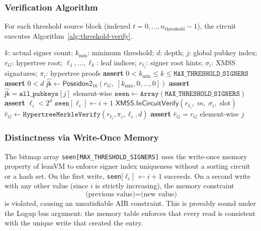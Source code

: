 \documentclass[11pt,a4paper]{article}
\newcommand{\XMSS}{\textsf{XMSS}\xspace}
\newcommand{\poseidon}{\textsf{Poseidon2}\xspace}
\newcommand{\leanVM}{\textsf{leanVM}\xspace}
\begin{document}
\subsubsection{Verification Algorithm}

For each threshold source block (indexed $t = 0, \ldots, n_{\text{threshold}} - 1$), the circuit executes Algorithm~\ref{alg:threshold-verify}.

\begin{algorithm}[H]
\caption{\texttt{threshold\_verify\_group} (in-circuit, zkDSL)}
\label{alg:threshold-verify}
  \small
\begin{algorithmic}[1]
\Require $k$: actual signer count; $k_{\min}$: minimum threshold; $d$: depth;
         $j$: global pubkey index; $r_G$: hypertree root;
         $\ell_1,\ldots,\ell_k$: leaf indices;
         $r_{\ell_i}$: signer root hints;
         $\sigma_i$: XMSS signatures;
         $\pi_i$: hypertree proofs
\State \textbf{assert} $0 < k_{\min} \leq k \leq \texttt{MAX\_THRESHOLD\_SIGNERS}$
  \quad{}
\State \textbf{assert} $0 < d$
\State $\widehat{\mathsf{jk}} \gets \poseidon_{16}(r_G,\;  [k_{\min}, 0, \ldots, 0])$
\State \textbf{assert} $\widehat{\mathsf{jk}} = \texttt{all\_pubkeys}[j]$ element-wise
  \quad{}
\State $\texttt{seen} \gets \texttt{Array}(\texttt{MAX\_THRESHOLD\_SIGNERS})$
  \quad{}
  \State \textbf{assert} $\ell_i < 2^d$ \quad{}
  \State $\texttt{seen}[\ell_i] \gets i + 1$
    \quad{}
  \State $\XMSS.\mathsf{InCircuitVerify}(r_{\ell_i},\; m,\; \sigma_i,\; \text{slot})$
    \quad{}
  \State $\hat{r}_G \gets \texttt{HypertreeMerkleVerify}(r_{\ell_i}, \pi_i, \ell_i, d)$
  \State \textbf{assert} $\hat{r}_G = r_G$ element-wise \quad{}
\EndFor
\State \Return $j$ \quad{}
\end{algorithmic}
\end{algorithm}

\subsubsection{Distinctness via Write-Once Memory}

The bitmap array \texttt{seen[MAX\_THRESHOLD\_SIGNERS]} uses the write-once memory property of \leanVM to enforce signer index uniqueness without a sorting circuit or a hash set.  On the first write, \texttt{seen}[$\ell_i$] $\gets i+1$ succeeds.  On a second write with any other value (since $i$ is strictly increasing), the memory constraint
\[
  \text{(previous value)} = \text{(new value)}
\]
is violated, causing an unsatisfiable AIR constraint.  This is provably sound under the Logup bus argument: the memory table enforces that every read is consistent with the unique write that created the entry.
\end{document}
